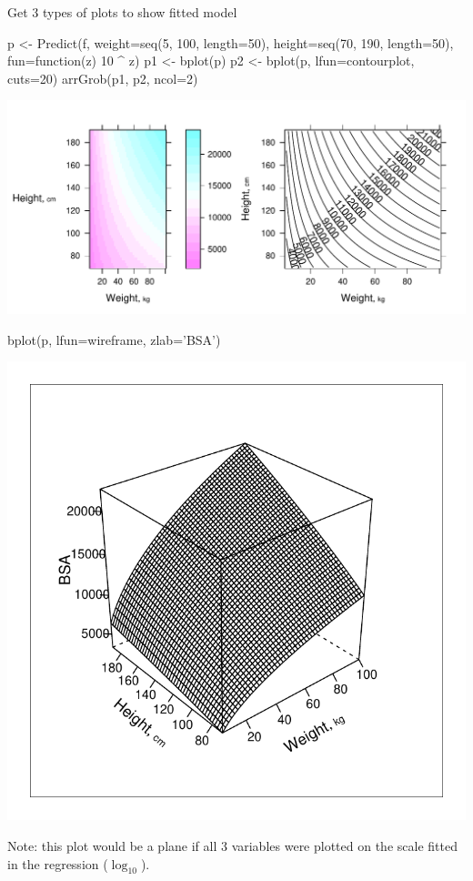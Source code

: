 Get 3 types of plots to show fitted model\ipacue
\begin{Schunk}
\begin{Sinput}
p <- Predict(f, weight=seq(5, 100, length=50),
             height=seq(70, 190, length=50), fun=function(z) 10 ^ z)
p1 <- bplot(p)
p2 <- bplot(p, lfun=contourplot, cuts=20)
arrGrob(p1, p2, ncol=2)
\end{Sinput}


\centerline{\includegraphics[width=\maxwidth]{reg-dreg3-1} }

\end{Schunk}
\begin{Schunk}
\begin{Sinput}
bplot(p, lfun=wireframe, zlab='BSA')
\end{Sinput}


\centerline{\includegraphics[width=\maxwidth]{reg-dreg4-1} }

\end{Schunk}
Note: this plot would be a plane if all 3 variables were plotted on
the scale fitted in the regression ($\log_{10}$).


